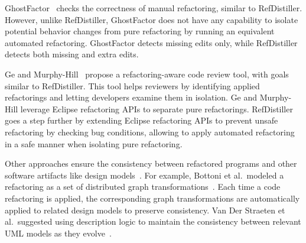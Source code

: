 \documentclass[runningheads,a4paper]{llncs}
\begin{document}
GhostFactor~\cite{geManual2014} checks the correctness of manual refactoring, similar to RefDistiller. 
However, unlike RefDistiller, GhostFactor does not have any capability to isolate potential behavior changes from pure refactoring by running an equivalent automated refactoring. GhostFactor detects missing edits only, while RefDistiller detects both missing and extra edits. 

Ge and Murphy-Hill~\cite{emersoncodereview:2014chase} propose a refactoring-aware code review tool, with goals similar to RefDistiller. This tool helps reviewers by identifying applied refactorings and letting developers examine them in isolation. Ge and Murphy-Hill leverage Eclipse refactoring APIs to separate pure refactorings. RefDistiller goes a step further by extending Eclipse refactoring APIs to prevent unsafe refactoring by checking bug conditions, allowing to apply automated refactoring in a safe manner when isolating pure refactoring. 


Other approaches ensure the consistency between refactored programs and other software artifacts like design models~\cite{Bottoni2003:coordinatedTransformation,Straeten2003:UML}. For example, Bottoni et al.~modeled a refactoring as a set of distributed graph transformations~\cite{Bottoni2003:coordinatedTransformation}. Each time a code refactoring is applied, the corresponding graph transformations are automatically applied to related design models to preserve consistency. Van Der Straeten et al.~suggested using description logic to maintain the consistency between relevant UML models as they evolve~\cite{Straeten2003:UML}.



\end{document}
